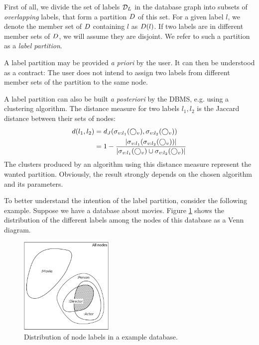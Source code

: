 First of all, we divide the set of labels $\mathcal{D}_L$ in the database graph
into subsets of \emph{overlapping} labels, that form a partition $D$ of
this set. For a given label $l$, we denote the member set of $D$
containing $l$ as $D(l)$.
If two labels are in different member sets of $D$, we will assume they
are disjoint.
We refer to such a partition as a \emph{label partition}.

A label partition may be provided \emph{a priori} by the user.
It can then be understood as a contract:
The user does not intend to assign two labels from different member
sets of the partition to the same node.

A label partition can also be built \emph{a posteriori} by the DBMS, e.g.
using a clustering algorithm.
The distance measure for two labels $l_1, l_2$ is the
Jaccard distance between their sets of nodes:
\begin{align}
\begin{split}
  \label{eq:jacc-dist}
  d(l_1, l_2) &= d_J(\sigma_{v:l_1}(\bigcirc_{v}),
                           \sigma_{v:l_2}(\bigcirc_{v})) \\
              &= 1 - \frac{{\left \vert \sigma_{v:l_1}(
                                 \sigma_{v:l_2}(\bigcirc_{v})) \right \vert}}
                          {{\left \vert \sigma_{v:l_1}(\bigcirc_{v}) \cup
                                 \sigma_{v:l_2}(\bigcirc_{v}) \right \vert}}
\end{split}
\end{align}
The clusters produced by an algorithm using this distance measure represent the
wanted partition. Obviously, the result strongly depends on the chosen
algorithm and its parameters.

To better understand the intention of the label partition, consider the following
example. Suppose we have a database about movies. Figure \ref{fig:label-dist-example}
shows the distribution of the different labels among the nodes of this database as a
Venn diagram.

\begin{figure}[h]
  \centering
  \includegraphics[width=0.4\textwidth]{figures/nodes-venn-diagram.pdf}
  \caption{Distribution of node labels in a example database.}
  \label{fig:label-dist-example}
\end{figure}

